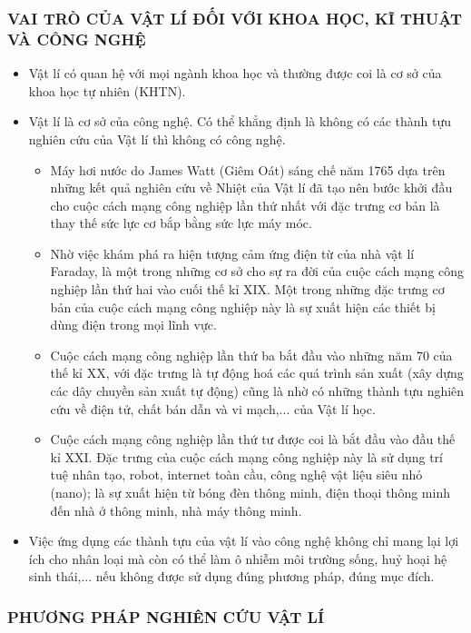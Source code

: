 \subsubsection{VAI TRÒ CỦA VẬT LÍ ĐỐI VỚI KHOA HỌC, KĨ THUẬT VÀ CÔNG NGHỆ}
\begin{itemize}
\item [a)] Vật lí có quan hệ với mọi ngành khoa học và thường được coi là cơ sở của khoa học tự nhiên (KHTN). 
\item [b)] Vật lí là cơ sở của công nghệ. Có thể khẳng định là không có các thành tựu nghiên cứu của Vật lí thì không có công nghệ.
\begin{itemize}
\item Máy hơi nước do James Watt (Giêm Oát) sáng chế năm 1765 dựa trên những kết quả nghiên cứu về Nhiệt của Vật lí đã tạo nên bước khởi đầu cho cuộc cách mạng công nghiệp lần thứ nhất với đặc trưng cơ bản là thay thế sức lực cơ bắp bằng sức lực máy móc.
\item Nhờ việc khám phá ra hiện tượng cảm ứng điện từ của nhà vật lí Faraday, là một trong những cơ sở cho sự ra đời của cuộc cách mạng công nghiệp lần thứ hai vào cuối thế kỉ XIX. Một trong những đặc trưng cơ bản của cuộc cách mạng công nghiệp này là sự xuất hiện các thiết bị dùng điện trong mọi lĩnh vực.
\item Cuộc cách mạng công nghiệp lần thứ ba bắt đầu vào những năm 70 của thế kỉ XX, với đặc trưng là tự động hoá các quá trình sản xuất (xây dựng các dây chuyền sản xuất tự động) cũng là nhờ có những thành tựu nghiên cứu về điện tử, chất bán dẫn và vi mạch,... của Vật lí học.
\item Cuộc cách mạng công nghiệp lần thứ tư được coi là bắt đầu vào đầu thế kỉ XXI. Đặc trưng của cuộc cách mạng công nghiệp này là sử dụng trí tuệ nhân tạo, robot, internet toàn cầu, công nghệ vật liệu siêu nhỏ (nano); là sự xuất hiện từ bóng đèn thông minh, điện thoại thông minh đến nhà ở thông minh, nhà máy thông minh.
\end{itemize}
\item [c)] Việc ứng dụng các thành tựu của vật lí vào công nghệ không chỉ mang lại lợi ích cho nhân loại mà còn có thể làm ô nhiễm môi trường sống, huỷ hoại hệ sinh thái,... nếu không được sử dụng đúng phương pháp, đúng mục đích.
\end{itemize}
\subsubsection{PHƯƠNG PHÁP NGHIÊN CỨU VẬT LÍ}
